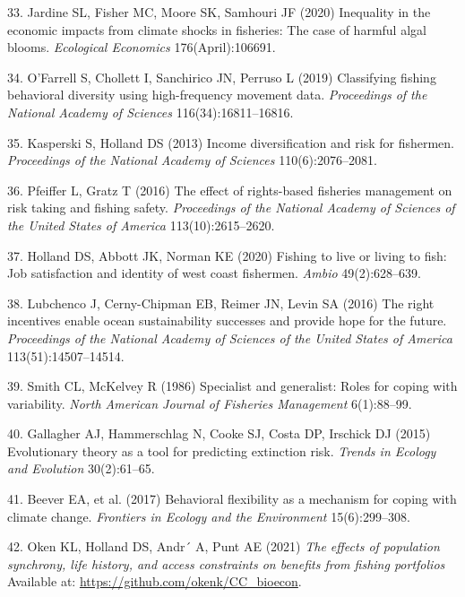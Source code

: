 \documentclass[9pt,twocolumn,twoside,lineno]{pnas-new}
\begin{document}
\leavevmode\hypertarget{ref-Jardine2020}{}%
33. Jardine SL, Fisher MC, Moore SK, Samhouri JF (2020) Inequality in
the economic impacts from climate shocks in fisheries: The case of
harmful algal blooms. \emph{Ecological Economics} 176(April):106691.

\leavevmode\hypertarget{ref-OFarrell2019}{}%
34. O'Farrell S, Chollett I, Sanchirico JN, Perruso L (2019) Classifying
fishing behavioral diversity using high-frequency movement data.
\emph{Proceedings of the National Academy of Sciences}
116(34):16811--16816.

\leavevmode\hypertarget{ref-Kasperski2013}{}%
35. Kasperski S, Holland DS (2013) Income diversification and risk for
fishermen. \emph{Proceedings of the National Academy of Sciences}
110(6):2076--2081.

\leavevmode\hypertarget{ref-Pfeiffer2016}{}%
36. Pfeiffer L, Gratz T (2016) The effect of rights-based fisheries
management on risk taking and fishing safety. \emph{Proceedings of the
National Academy of Sciences of the United States of America}
113(10):2615--2620.

\leavevmode\hypertarget{ref-Holland2020}{}%
37. Holland DS, Abbott JK, Norman KE (2020) Fishing to live or living to
fish: Job satisfaction and identity of west coast fishermen.
\emph{Ambio} 49(2):628--639.

\leavevmode\hypertarget{ref-Lubchenco2016}{}%
38. Lubchenco J, Cerny-Chipman EB, Reimer JN, Levin SA (2016) The right
incentives enable ocean sustainability successes and provide hope for
the future. \emph{Proceedings of the National Academy of Sciences of the
United States of America} 113(51):14507--14514.

\leavevmode\hypertarget{ref-Smith1986}{}%
39. Smith CL, McKelvey R (1986) Specialist and generalist: Roles for
coping with variability. \emph{North American Journal of Fisheries
Management} 6(1):88--99.

\leavevmode\hypertarget{ref-Gallagher2015}{}%
40. Gallagher AJ, Hammerschlag N, Cooke SJ, Costa DP, Irschick DJ (2015)
Evolutionary theory as a tool for predicting extinction risk.
\emph{Trends in Ecology and Evolution} 30(2):61--65.

\leavevmode\hypertarget{ref-Beever2017}{}%
41. Beever EA, et al. (2017) Behavioral flexibility as a mechanism for
coping with climate change. \emph{Frontiers in Ecology and the
Environment} 15(6):299--308.

\leavevmode\hypertarget{ref-Oken2021}{}%
42. Oken KL, Holland DS, Andr´ A, Punt AE (2021) \emph{The effects of
population synchrony, life history, and access constraints on benefits
from fishing portfolios} Available at:
\url{https://github.com/okenk/CC_bioecon}.
\end{document}
